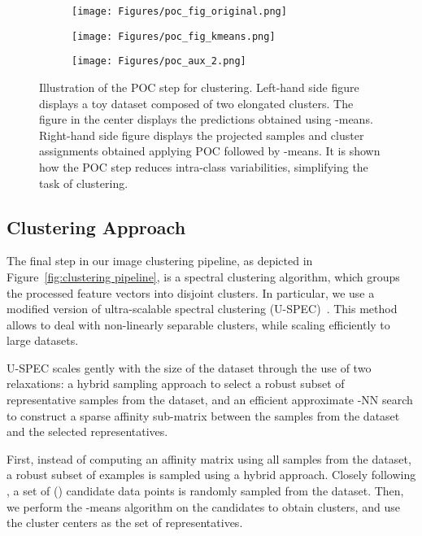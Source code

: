 \documentclass[11pt]{article}
\theoremstyle{definition}
\newcommand{\Figure}[1]{Figure~\ref{#1}}
\begin{document}
\begin{figure*}[bt]	
	\begin{subfigure}{0.33\textwidth}	
		\texttt{[image: Figures/poc\_fig\_original.png]}
		\label{fig:subfig1}
	\end{subfigure}
\begin{subfigure}{0.33\textwidth}
		\centering
		\texttt{[image: Figures/poc\_fig\_kmeans.png]}
		\label{fig:subfig2}
	\end{subfigure}
\begin{subfigure}{0.33\textwidth}
		\texttt{[image: Figures/poc\_aux\_2.png]}
		\label{fig:subfig1}
	\end{subfigure}
	\vspace{-0.3cm}
	\caption{Illustration of the POC step for clustering. Left-hand side figure displays a toy dataset composed of two elongated clusters. The figure in the center displays the predictions obtained using -means. Right-hand side figure displays the projected samples and cluster assignments obtained applying POC followed by -means. It is shown how the POC step reduces intra-class variabilities, simplifying the task of clustering.}
	\label{fig:illustrating_poc}
\end{figure*}



\subsection{Clustering Approach}\label{sec:Clustering Approach}

The final step in our image clustering pipeline, as depicted in \Figure{fig:clustering pipeline}, is a spectral clustering algorithm, which groups the  processed feature vectors into  disjoint clusters.
In particular, we use a modified version of ultra-scalable spectral clustering (U-SPEC)~\cite{Huang_UltraScalableSpectralClustering_2019}. This method
allows to deal with non-linearly separable clusters, while scaling efficiently to large datasets.

U-SPEC scales gently with the size of the dataset through the use of two relaxations: a hybrid sampling approach to select a robust subset of  representative samples from the dataset, and an efficient approximate -NN search to construct a sparse affinity sub-matrix between the  samples from the dataset and the selected  representatives.

First, instead of computing an affinity matrix using all samples from the dataset, a robust subset of  examples is sampled using a hybrid approach. Closely following \cite{Huang_UltraScalableSpectralClustering_2019}, a set of  () candidate data points is randomly sampled from the dataset. Then, we perform the -means algorithm on the  candidates to obtain  clusters, and use the  cluster centers as the set of representatives.
\end{document}
